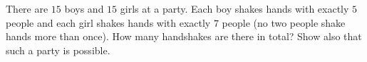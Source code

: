 There are $15$ boys and $15$ girls at a party. Each boy shakes hands with exactly $5$ people and each girl shakes hands with exactly $7$ people (no two people shake hands more than once). How many handshakes are there in total? Show also that such a party is possible.
